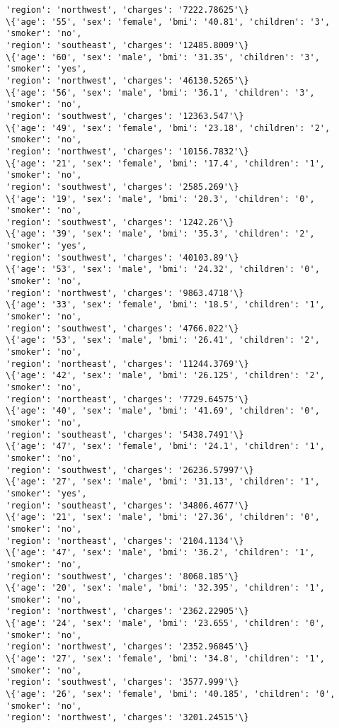 \documentclass[11pt]{article}
\begin{document}
\begin{Verbatim}[commandchars=\\\{\}]
'region': 'northwest', 'charges': '7222.78625'\}
\{'age': '55', 'sex': 'female', 'bmi': '40.81', 'children': '3', 'smoker': 'no',
'region': 'southeast', 'charges': '12485.8009'\}
\{'age': '60', 'sex': 'male', 'bmi': '31.35', 'children': '3', 'smoker': 'yes',
'region': 'northwest', 'charges': '46130.5265'\}
\{'age': '56', 'sex': 'male', 'bmi': '36.1', 'children': '3', 'smoker': 'no',
'region': 'southwest', 'charges': '12363.547'\}
\{'age': '49', 'sex': 'female', 'bmi': '23.18', 'children': '2', 'smoker': 'no',
'region': 'northwest', 'charges': '10156.7832'\}
\{'age': '21', 'sex': 'female', 'bmi': '17.4', 'children': '1', 'smoker': 'no',
'region': 'southwest', 'charges': '2585.269'\}
\{'age': '19', 'sex': 'male', 'bmi': '20.3', 'children': '0', 'smoker': 'no',
'region': 'southwest', 'charges': '1242.26'\}
\{'age': '39', 'sex': 'male', 'bmi': '35.3', 'children': '2', 'smoker': 'yes',
'region': 'southwest', 'charges': '40103.89'\}
\{'age': '53', 'sex': 'male', 'bmi': '24.32', 'children': '0', 'smoker': 'no',
'region': 'northwest', 'charges': '9863.4718'\}
\{'age': '33', 'sex': 'female', 'bmi': '18.5', 'children': '1', 'smoker': 'no',
'region': 'southwest', 'charges': '4766.022'\}
\{'age': '53', 'sex': 'male', 'bmi': '26.41', 'children': '2', 'smoker': 'no',
'region': 'northeast', 'charges': '11244.3769'\}
\{'age': '42', 'sex': 'male', 'bmi': '26.125', 'children': '2', 'smoker': 'no',
'region': 'northeast', 'charges': '7729.64575'\}
\{'age': '40', 'sex': 'male', 'bmi': '41.69', 'children': '0', 'smoker': 'no',
'region': 'southeast', 'charges': '5438.7491'\}
\{'age': '47', 'sex': 'female', 'bmi': '24.1', 'children': '1', 'smoker': 'no',
'region': 'southwest', 'charges': '26236.57997'\}
\{'age': '27', 'sex': 'male', 'bmi': '31.13', 'children': '1', 'smoker': 'yes',
'region': 'southeast', 'charges': '34806.4677'\}
\{'age': '21', 'sex': 'male', 'bmi': '27.36', 'children': '0', 'smoker': 'no',
'region': 'northeast', 'charges': '2104.1134'\}
\{'age': '47', 'sex': 'male', 'bmi': '36.2', 'children': '1', 'smoker': 'no',
'region': 'southwest', 'charges': '8068.185'\}
\{'age': '20', 'sex': 'male', 'bmi': '32.395', 'children': '1', 'smoker': 'no',
'region': 'northwest', 'charges': '2362.22905'\}
\{'age': '24', 'sex': 'male', 'bmi': '23.655', 'children': '0', 'smoker': 'no',
'region': 'northwest', 'charges': '2352.96845'\}
\{'age': '27', 'sex': 'female', 'bmi': '34.8', 'children': '1', 'smoker': 'no',
'region': 'southwest', 'charges': '3577.999'\}
\{'age': '26', 'sex': 'female', 'bmi': '40.185', 'children': '0', 'smoker': 'no',
'region': 'northwest', 'charges': '3201.24515'\}

\end{Verbatim}
\end{document}
